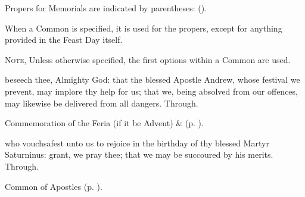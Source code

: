 \fancyhead[RO,LE]{}
\fancyhead[RE,LO]{}

\begin{rubric}
	Propers for Memorials are indicated by parentheses: ().
\end{rubric}

\begin{rubric}
	When a Common is specified, it is used for the propers, except for anything provided in the Feast Day itself.
	
	\textsc{Note,} Unless otherwise specified, the first options within a Common are used.
\end{rubric}



 beseech thee, Almighty God: that the blessed Apostle Andrew, whose festival we prevent, may implore thy help for us; that we, being absolved from our offences, may likewise be delivered from all dangers. Through.

\begin{rubric}
	Commemoration of the Feria (if it be Advent) \&  (p. \pageref{SaturninusCollect}).
\end{rubric}



\memorialCollect\label{SaturninusCollect}
 who vouchsafest unto us to rejoice in the birthday of thy blessed Martyr Saturninus: grant, we pray thee; that we may be succoured by his merits. Through.



\begin{rubric}
	Common of Apostles (p. \pageref{CommonApostles}).
\end{rubric}


\firstEvensong
{}

